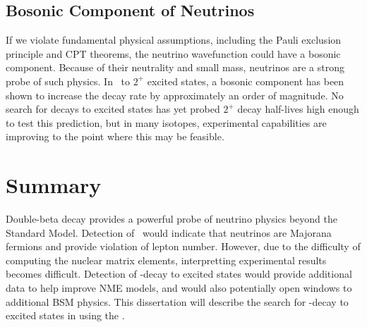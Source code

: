 \documentclass[/main.tex]{subfiles}
\begin{document}
\subsection{Bosonic Component of Neutrinos}
If we violate fundamental physical assumptions, including the Pauli exclusion principle and CPT theorems, the neutrino wavefunction could have a bosonic component\cite{Dolgov2005}.
Because of their neutrality and small mass, neutrinos are a strong probe of such physics.
In \tnbb\ to $2^+$ excited states, a bosonic component has been shown to increase the decay rate by approximately an order of magnitude\cite{barabash2007, Tornow2010}.
No search for decays to excited states has yet probed $2^+$ decay half-lives high enough to test this prediction, but in many isotopes, experimental capabilities are improving to the point where this may be feasible.

\section{Summary}
Double-beta decay provides a powerful probe of neutrino physics beyond the Standard Model.
Detection of \znbb\ would indicate that neutrinos are Majorana fermions and provide violation of lepton number.
However, due to the difficulty of computing the nuclear matrix elements, interpretting experimental results becomes difficult.
Detection of \bb -decay to excited states would provide additional data to help improve NME models, and would also potentially open windows to additional BSM physics.
This dissertation will describe the search for \bb -decay to excited states in  using the \MJD.

\onlyinsubfile{
  
  
}
\end{document}
